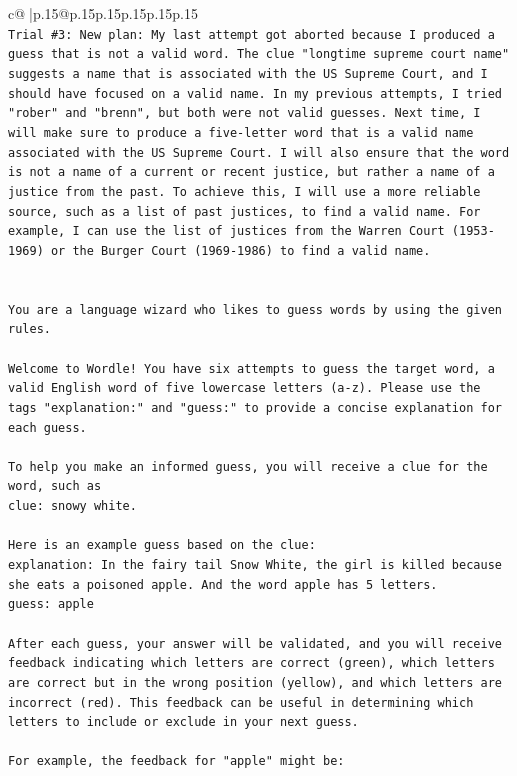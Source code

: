 \documentclass{article}
\begin{document}
{\begin{supertabular}{c@{$\;$}|p{.15\linewidth}@{}p{.15\linewidth}p{.15\linewidth}p{.15\linewidth}p{.15\linewidth}p{.15\linewidth}}
{{{\\ 
\texttt{Trial \#3: New plan: My last attempt got aborted because I produced a guess that is not a valid word. The clue "longtime supreme court name" suggests a name that is associated with the US Supreme Court, and I should have focused on a valid name. In my previous attempts, I tried "rober" and "brenn", but both were not valid guesses. Next time, I will make sure to produce a five{-}letter word that is a valid name associated with the US Supreme Court. I will also ensure that the word is not a name of a current or recent justice, but rather a name of a justice from the past. To achieve this, I will use a more reliable source, such as a list of past justices, to find a valid name. For example, I can use the list of justices from the Warren Court (1953{-}1969) or the Burger Court (1969{-}1986) to find a valid name.} \\
\\ 
\\ 
\texttt{You are a language wizard who likes to guess words by using the given rules.} \\
\\ 
\texttt{Welcome to Wordle! You have six attempts to guess the target word, a valid English word of five lowercase letters (a{-}z). Please use the tags "explanation:" and "guess:" to provide a concise explanation for each guess.} \\
\\ 
\texttt{To help you make an informed guess, you will receive a clue for the word, such as} \\
\texttt{clue: snowy white.} \\
\\ 
\texttt{Here is an example guess based on the clue:} \\
\texttt{explanation: In the fairy tail Snow White, the girl is killed because she eats a poisoned apple. And the word apple has 5 letters.} \\
\texttt{guess: apple} \\
\\ 
\texttt{After each guess, your answer will be validated, and you will receive feedback indicating which letters are correct (green), which letters are correct but in the wrong position (yellow), and which letters are incorrect (red). This feedback can be useful in determining which letters to include or exclude in your next guess.} \\
\\ 
\texttt{For example, the feedback for "apple" might be:} \\
}}}
\end{supertabular}}
\end{document}
